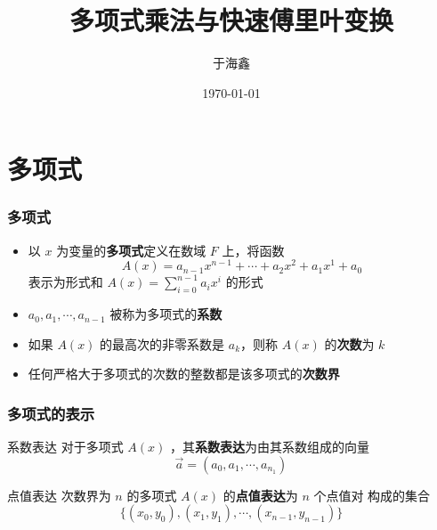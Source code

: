 \documentclass[UTF8]{ctexbeamer}
\begin{document}
\title{多项式乘法与快速傅里叶变换}
\author{\songti 于海鑫}

\date{\today}

\frame{\titlepage}

\section{多项式}
\begin{frame}
\frametitle{多项式}
\begin{itemize}
  \item 以 $x$ 为变量的\textbf{多项式}定义在数域 $F$ 上，将函数
  $$ A(x) = a_{n-1}x^{n - 1} + \cdots + a_2 x^2 + a_1 x^1 + a_0$$
  表示为形式和 $ A(x) = \sum_{i = 0}^{n - 1} a_i x^i$ 的形式
  \item $a_0, a_1, \cdots , a_{n-1}$ 被称为多项式的\textbf{系数}
  \item 如果 $A(x)$ 的最高次的非零系数是 $a_k$，则称 $A(x)$ 的\textbf{次数}为 $k$
  \item 任何严格大于多项式的次数的整数都是该多项式的\textbf{次数界}
\end{itemize}
\end{frame}

\begin{frame}
    \frametitle{多项式的表示}
    \begin{block}{系数表达}
        对于多项式 $A(x)$ ，其\textbf{系数表达}为由其系数组成的向量
        $$\vec{a} = (a_0, a_1, \cdots, a_{n_1})$$
    \end{block}
    \begin{block}{点值表达}
        次数界为 $n$ 的多项式 $A(x)$ 的\textbf{点值表达}为 $n$ 个点值对
        构成的集合 $$\{ (x_0, y_0),  (x_1, y_1), \cdots, (x_{n-1}, y_{n-1})\}$$
        \begin{center}
        \end{center}
    \end{block}
\end{frame}
\end{document}

